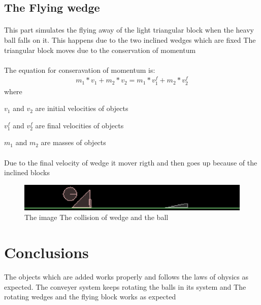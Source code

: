 \documentclass[11pt]{article}
\begin{document}
\subsection{The Flying wedge}
\paragraph{}
This part simulates the flying away of the light triangular block when the heavy ball falls on it. This happens due to the two inclined wedges which are fixed
\newline
The triangular block moves due to the conservation of momentum
\paragraph{}
The equation for conseravation of momentum\cite{book} is:
\begin{eqnarray}
m_1*v_1+m_2*v_2=m_1*v^f_1+m_2*v^f_2
\end{eqnarray}
where\par
\begin{description}
  \item $v_1$ and $v_2$ are initial velocities of objects
  \item $v^f_1$ and $v^f_2$ are final velocities of objects
  \item $m_1$ and $m_2$ are masses of objects
 \end{description}
\paragraph{}
Due to the final velocity of wedge it mover rigth and then goes up because of the inclined blocks
\begin{figure}[!ht]
    \centering
        \includegraphics[scale=0.8]{img3.eps}
        \caption{\footnotesize{The image The collision of wedge and the ball}}
\end{figure}

\section{Conclusions}
The objects which are added works properly and follows the laws of ohysics as expected. 
The conveyer system keeps rotating the balls in its system and The rotating wedges and the flying block works as expected\\




\end{document}
